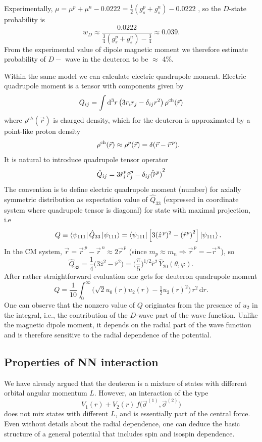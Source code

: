 \documentclass[11pt,a4paper]{article}
\newcommand{\op}[1]{\hat{#1}}
\newcommand{\ud}{\mathrm{d}}
\begin{document}
Experimentally, $\mu=\mu^p+\mu^n-0.0222=\tfrac12(g_s^p+g_s^n)-0.0222$ , so the
$D$-state probability is
\[
w_D \approx
\frac{0.0222}{\tfrac34(g_s^p+g_s^n)-\tfrac34} \approx  0.039.
\]
From the experimental value of dipole magnetic moment we therefore estimate probability of $D-$ wave in the deuteron to be $\approx$ 4\%.

Within the same model we can calculate electric quadrupole moment. Electric quadrupole moment is a tensor with components given by
\[
Q_{ij}=\int \ud^3r\,\big(3r_ir_j-\delta_{ij}r^2\big)\,\rho^{\rm ch}(\vec r)
\]
where $\rho^{ch}(\vec r)$ is charged density, which for the deuteron is approximated by a point-like proton density
\[
\qquad
\rho^{\rm ch}(\vec r)\approx\rho^p(\vec r)=\delta(\vec r-\vec r^{\,p}).
\]
It is natural to introduce quadrupole tensor operator
\[
\op Q_{ij}=3\op r^{p}_i\op r^{p}_j - \delta_{ij}{(\op \vec{r^p})}^2
\]
The convention is to define electric quadrupole moment (number) for axially symmetric distribution as
expectation value of $\op Q_{33}$ (expressed  in coordinate system where quadrupole tensor is diagonal) for state with maximal projection, i.e 
\[
\qquad
Q \equiv \bra {\psi_{111}} \op Q_{33} \ket {\psi_{111}}=\bra {\psi_{111}} \Big[3(\hat z^{\,p})^2-{(\op r^{p})}^2\Big] \ket {\psi_{111}}.
\]
In the CM system, $\vec r=\vec r^{\,p}-\vec r^{\,n}\approx 2\vec r^{\,p}$ (since
$m_p\approx m_n\Rightarrow \vec r^{\,p}=-\vec r^{\,n}$), so
\[
\op Q_{33}=\frac{1}{4}\big(3\op z^2-\op r^2\big)=\Big(\frac{\pi}{5}\Big)^{1/2}\op r^2\,\op Y_{20}(\theta,\varphi).
\]
After rather straightforward evaluation one gets for deuteron quadrupole moment
\[
Q =\frac{1}{10}\int_0^\infty\Big(\sqrt{2} u_0 (r) u_2 (r) -\tfrac12 u_2(r)^2\Big)\,r^2\,\ud r .
\]
One can observe that the nonzero value of $Q$ originates from the presence of $u_2$ in the integral, i.e., the contribution of the $D$-wave part of the wave function. Unlike the magnetic dipole moment, it depends on the radial part of the wave function and is therefore sensitive to the radial dependence of the potential. 

\subsection {Properties of NN interaction}
We have already argued that the deuteron is a mixture of states with different orbital angular momentum $L$. However, an interaction of the type
\[
V_1(r)+V_2(r)\,f\big(\vec\sigma^{(1)},\vec\sigma^{(2)}\big)
\]
does not mix states with different $L$, and is essentially part of the central force. Even without details about the radial dependence, one can deduce the basic structure of a general potential that includes spin and isospin dependence.
\end{document}
